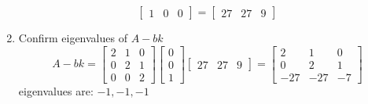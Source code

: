 \begin{enumerate}
\begin{equation}
\begin{bmatrix}
        1 & 0 & 0 
      \end{bmatrix} =
      \begin{bmatrix}
        27 & 27 & 9
      \end{bmatrix}
    \end{equation}
  \item Confirm eigenvalues of $A-bk$
    \begin{equation}
      A - bk =
      \begin{bmatrix}
        2 & 1 & 0 \\
        0 & 2 & 1 \\
        0 & 0 & 2
      \end{bmatrix}
      \begin{bmatrix}
        0 \\
        0 \\
        1
      \end{bmatrix}
      \begin{bmatrix}
        27 & 27 & 9
      \end{bmatrix} =
      \begin{bmatrix}
        2 & 1 & 0 \\
        0 & 2 & 1 \\
        -27 & -27 & -7
      \end{bmatrix}
    \end{equation}
    eigenvalues are: $-1, -1, -1$
  \end{enumerate}
  